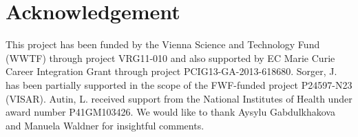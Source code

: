 \vspace{-3mm}
\section{Acknowledgement}

This project has been funded by the Vienna Science and Technology Fund (WWTF) through project VRG11-010 and also supported by EC Marie Curie Career Integration Grant through project PCIG13-GA-2013-618680. Sorger, J. has been partially supported in the scope of the FWF-funded project P24597-N23 (VISAR).
Autin, L. received support from the National Institutes of Health under award number P41GM103426. We would like to thank Aysylu Gabdulkhakova and Manuela Waldner for insightful comments.
